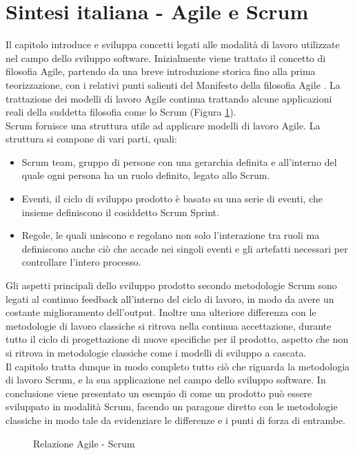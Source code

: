 \documentclass[../main.tex]{subfiles}
\begin{document}
\section{Sintesi italiana - Agile e Scrum}
Il capitolo introduce e sviluppa concetti legati alle modalità di lavoro utilizzate nel campo dello sviluppo software. Inizialmente viene trattato il concetto di filosofia Agile, partendo da una breve introduzione storica fino alla prima teorizzazione, con i relativi punti salienti del Manifesto della filosofia Agile \cite{beck2001agile}. La trattazione dei modelli di lavoro Agile continua trattando alcune applicazioni reali della suddetta filosofia come lo Scrum (Figura \ref{fig:agilesrre}).\\
Scrum fornisce una struttura utile ad applicare modelli di lavoro Agile. La struttura si compone di vari parti, quali:
\begin{itemize}
    \item Scrum team, gruppo di persone con una gerarchia definita e all'interno del quale ogni persona ha un ruolo definito, legato allo Scrum.
    \item Eventi, il ciclo di sviluppo prodotto è basato su una serie di eventi, che insieme definiscono il cosiddetto Scrum Sprint.
    \item Regole, le quali uniscono e regolano non solo l'interazione tra ruoli ma definiscono anche ciò che accade nei singoli eventi e gli artefatti necessari per controllare l'intero processo.
\end{itemize}
Gli aspetti principali dello sviluppo prodotto secondo metodologie Scrum sono legati al continuo feedback all'interno del ciclo di lavoro, in modo da avere un costante miglioramento dell'output. Inoltre una ulteriore differenza con le metodologie di lavoro classiche si ritrova nella continua accettazione, durante tutto il ciclo di progettazione di nuove specifiche per il prodotto, aspetto che non si ritrova in metodologie classiche come i modelli di sviluppo a cascata.\\
Il capitolo tratta dunque in modo completo tutto ciò che riguarda la metodologia di lavoro Scrum, e la sua applicazione nel campo dello sviluppo software. In conclusione viene presentato un esempio di come un prodotto può essere sviluppato in modalità Scrum, facendo un paragone diretto con le metodologie classiche in modo tale da evidenziare le differenze e i punti di forza di entrambe.
\begin{figure}
    \centering
{} 
    \caption{Relazione Agile - Scrum}
    \label{fig:agilesrre}
\end{figure}
\end{document}
